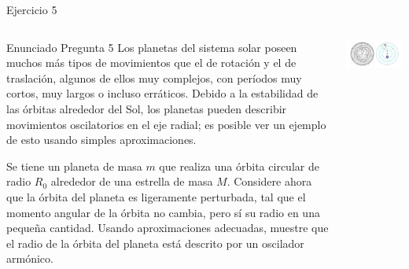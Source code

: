 \documentclass[
    10pt,
    aspectratio=169,
    xcolor={dvipsnames},
    spanish,
    ]{beamer}
\begin{document}
\begin{frame}{Ejercicio 5}
  \footnotesize
  \begin{columns}[T,totalwidth=\textwidth]
    \begin{column}{0.58\textwidth}
      \begin{block}{Enunciado Pregunta 5}
    Los planetas del sistema solar poseen muchos más tipos de movimientos que el de rotación y el de traslación, algunos de ellos muy complejos, con períodos muy cortos, muy largos o incluso erráticos. Debido a la estabilidad de las órbitas alrededor del Sol, los planetas pueden describir movimientos oscilatorios en el eje radial; es posible ver un ejemplo de esto usando simples aproximaciones.

Se tiene un planeta de masa $m$ que realiza una órbita circular de radio $R_0$ alrededor de una estrella de masa $M$. Considere ahora que la órbita del planeta es ligeramente perturbada, tal que el momento angular de la órbita no cambia, pero sí su radio en una pequeña cantidad. Usando aproximaciones adecuadas, muestre que el radio de la órbita del planeta está descrito por un oscilador armónico.
      \end{block}
    \end{column}
    \begin{column}{0.40\textwidth}
      \centering
  \vspace*{1cm}
      \includegraphics[width=1\textwidth]{Auxiliar_2_10.png}
    \end{column}
  \end{columns}
\end{frame}
\end{document}

